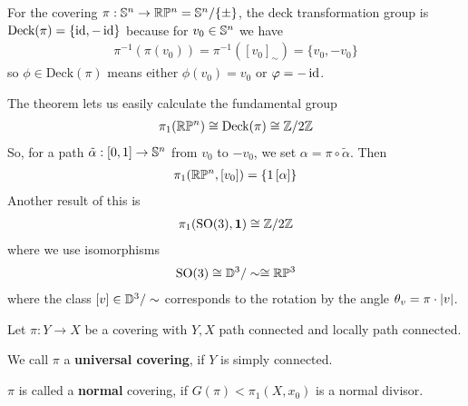 \begin{ex}[]
For the covering $\pi: \mathbb{S}^{n} \to  \mathbb{R}\mathbb{P}^{n} = \mathbb{S}^{n}/\{\pm\}$, the deck transformation group is
$\text{Deck}(\pi) = \{\operatorname{id}, - \operatorname{id}\}$
because for $v_0 \in \mathbb{S}^{n}$ we have
\begin{align*}
  \pi^{-1}(\pi(v_0)) = \pi^{-1}([v_0]_{\sim}) = \{v_0,-v_0\}
\end{align*}
so $\phi \in \text{Deck}(\pi)$ means either $\phi(v_0) = v_0$ or $\varphi = - \operatorname{id}$.

The theorem lets us easily calculate the fundamental group
\begin{align*}
  \pi_1(\mathbb{R}\mathbb{P}^{n}) \cong \text{Deck}(\pi) \cong \mathbb{Z}/2\mathbb{Z}
\end{align*}
So, for a path $\tilde{\alpha}:[0,1] \to \mathbb{S}^{n}$ from $v_0$ to $-v_0$, we set $\alpha = \pi \circ \tilde{\alpha}$.
Then
\begin{align*}
  \pi_1(\mathbb{R}\mathbb{P}^{n},[v_0]) = \{1\, [\alpha]\}
\end{align*}
Another result of this is
\begin{align*}
  \pi_1(\text{SO}(3),\bm{1}) \cong \mathbb{Z}/2\mathbb{Z}
\end{align*}
where we use isomorphisms
\begin{align*}
  \text{SO}(3) \cong \mathbb{D}^{3}/\sim \cong \mathbb{R}\mathbb{P}^{3}
\end{align*}
where the class $[v] \in \mathbb{D}^{3}/\sim$ corresponds to the rotation by the angle $\theta_v = \pi \cdot \vert v\vert$.
\end{ex}


\begin{dfn}[]
Let $\pi: Y \to  X$ be a covering with $Y,X$ path connected and locally path connected.

We call $\pi$ a \textbf{universal covering}, if $Y$ is simply connected.

$\pi$ is called a \textbf{normal} covering, if $G(\pi) < \pi_1(X,x_0)$ is a normal divisor.
\end{dfn}

